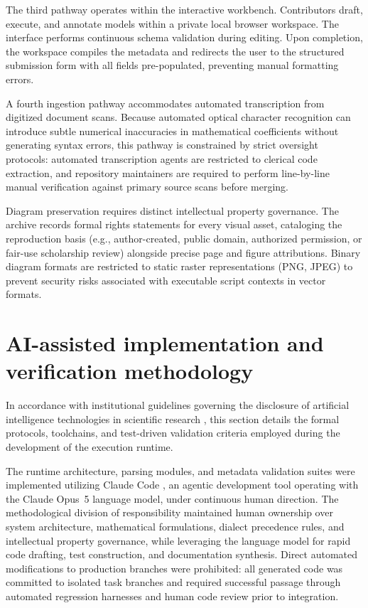 \documentclass[11pt,a4paper]{article}
\begin{document}
The third pathway operates within the interactive workbench. Contributors draft, execute, and annotate models within a private local browser workspace. The interface performs continuous schema validation during editing. Upon completion, the workspace compiles the metadata and redirects the user to the structured submission form with all fields pre-populated, preventing manual formatting errors.

A fourth ingestion pathway accommodates automated transcription from digitized document scans. Because automated optical character recognition can introduce subtle numerical inaccuracies in mathematical coefficients without generating syntax errors, this pathway is constrained by strict oversight protocols: automated transcription agents are restricted to clerical code extraction, and repository maintainers are required to perform line-by-line manual verification against primary source scans before merging.

Diagram preservation requires distinct intellectual property governance. The archive records formal rights statements for every visual asset, cataloging the reproduction basis (e.g., author-created, public domain, authorized permission, or fair-use scholarship review) alongside precise page and figure attributions. Binary diagram formats are restricted to static raster representations (PNG, JPEG) to prevent security risks associated with executable script contexts in vector formats.

\section{AI-assisted implementation and verification methodology}
\label{sec:llm}

In accordance with institutional guidelines governing the disclosure of artificial intelligence technologies in scientific research \citep{elsevierAI}, this section details the formal protocols, toolchains, and test-driven validation criteria employed during the development of the execution runtime.

The runtime architecture, parsing modules, and metadata validation suites were implemented utilizing Claude Code \citep{claudeCode}, an agentic development tool operating with the Claude Opus~5 language model, under continuous human direction. The methodological division of responsibility maintained human ownership over system architecture, mathematical formulations, dialect precedence rules, and intellectual property governance, while leveraging the language model for rapid code drafting, test construction, and documentation synthesis. Direct automated modifications to production branches were prohibited: all generated code was committed to isolated task branches and required successful passage through automated regression harnesses and human code review prior to integration.
\end{document}
